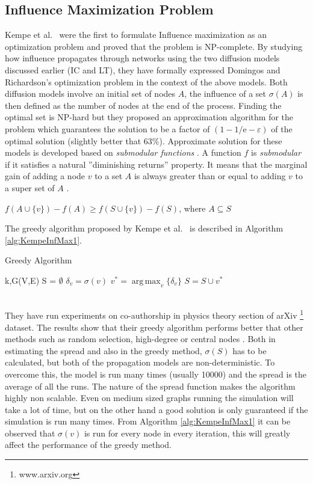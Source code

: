 \documentclass[english]{tktltiki}
\DeclareMathOperator*{\argmax}{arg\,max}
\begin{document}
\subsection{Influence Maximization Problem}
Kempe et al.\ \cite{kempe03} were the first to formulate Influence maximization as an optimization problem and proved that the problem is NP-complete. By studying how influence propagates through networks using the two diffusion models discussed earlier (IC and LT), they have formally expressed Domingos and Richardson's \cite{domingo01} optimization problem in the context of the above models. Both diffusion models involve an initial set of nodes $A$, the influence of a set $\sigma (A)$ is then defined as the number of nodes at the end of the process. Finding the optimal set is NP-hard but they proposed an approximation algorithm for the problem which guarantees the solution to be a factor of $(1 - 1/ \mathrm{e} - \varepsilon)$ of the optimal solution (slightly better that 63\%). 
Approximate solution for these models is developed based on \textit{submodular functions} \cite{nemhauser78}.
A function $f$ is \textit{submodular} if it satisfies a natural ''diminishing returns'' property. It means that the marginal gain of adding a node $v$ to a set $A$ is always greater than or equal to adding $v$ to a super set of $A$ . 
\begin{center}
$f(A \cup \{v\}) - f(A) \geq f(S \cup \{v\}) - f(S)$, where $A \subseteq S$
\end{center}
The greedy algorithm proposed by Kempe et al.\ \cite{kempe03} is described in Algorithm \ref{alg:KempeInfMax1}. 
\begin{algorithm}[ht!]
\caption{Greedy Algorithm}
\label{alg:KempeInfMax1}
\begin{algorithmic}
\Require k,G(V,E)
\State S = $\emptyset$
		\State $\delta_v = \sigma(v)$
	\EndFor
	\State $v^* = \argmax_v \{\delta_v\}$
	\State $S = S \cup v^*$
\EndFor
\end{algorithmic}
\end{algorithm}
\\
They have run experiments on co-authorship in physics theory section of arXiv \footnote{www.arxiv.org} dataset. The results show that their greedy algorithm performs better that other methods such as random selection, high-degree or central nodes .
Both in estimating the spread and also in the greedy method, $\sigma (S)$ has to be calculated, but both of the propagation models are non-deterministic. To overcome this, the model is run many times (usually 10000) and the spread is the average of all the runs. The nature of the spread function makes the algorithm highly non scalable. Even on medium sized graphs running the simulation will take a lot of time, but on the other hand a good solution is only guaranteed if the simulation is run many times. From Algorithm \ref{alg:KempeInfMax1} it can be observed that $\sigma(v)$ is run for every node in every iteration, this will greatly affect the performance of the greedy method.
\end{document}
